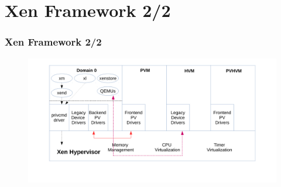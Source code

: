 \documentclass[aspectratio=169]{beamer}
\begin{document}

\section{Xen Framework 2/2}
\begin{frame}
\frametitle{Xen Framework 2/2}
\begin{figure}
\includegraphics[width=1.0\linewidth]{figures/xen.pdf}
\end{figure}
\end{frame}

\end{document}
